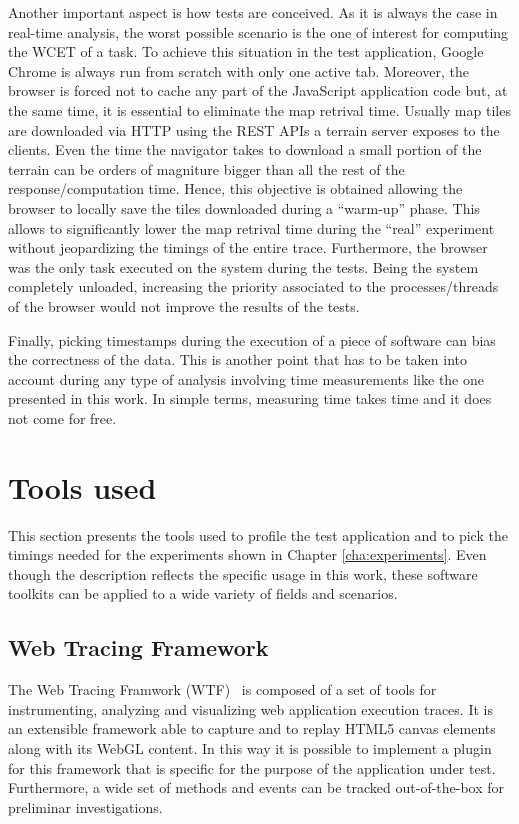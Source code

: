 Another important aspect is how tests are conceived. As it is always the case in
real-time analysis, the worst possible scenario is the one of interest for
computing the WCET of a task. To achieve this situation in the test application,
Google Chrome is always run from scratch with only one active tab. Moreover, the browser
is forced not to cache any part of the JavaScript application code but,
at the same time, it is essential to eliminate the map retrival time.
Usually map tiles are
downloaded via HTTP using the REST APIs a terrain server exposes to the clients.
Even the time the navigator takes to download a small portion of the terrain
can be orders of magniture bigger than all the rest of the response/computation time.
Hence, this objective is obtained allowing the browser to locally save the
tiles downloaded during a ``warm-up'' phase. This allows to significantly lower
the map retrival time during the ``real'' experiment without jeopardizing the
timings of the entire trace. Furthermore, the browser was the only task executed
on the system during the tests. Being the system completely unloaded, increasing
the priority associated to the processes/threads of the browser would not improve
the results of the tests.

Finally, picking timestamps during the execution of a piece of software can bias
the correctness of the data. This is another point that has to be
taken into account during any type of analysis involving time measurements like
the one presented in this work. In simple terms, measuring time takes time and
it does not come for free.


\section{Tools used}
This section presents the tools used to profile the test application and to pick
the timings needed for the experiments shown in Chapter \ref{cha:experiments}.
Even though the description reflects the specific usage in this work, these
software toolkits can be applied to a wide variety of fields and scenarios.

\subsection{Web Tracing Framework} \label{sec:wtf}
The Web Tracing Framwork (WTF)~\cite{wtf} is composed of a set of tools for
instrumenting, analyzing and visualizing web application execution traces.
It is an extensible framework able to capture and to replay HTML5 canvas elements
along with its WebGL content. In this way it is possible to implement a plugin for
this framework that is specific for the purpose of the application under test.
Furthermore, a wide set
of methods and events can be tracked out-of-the-box for preliminar investigations.

